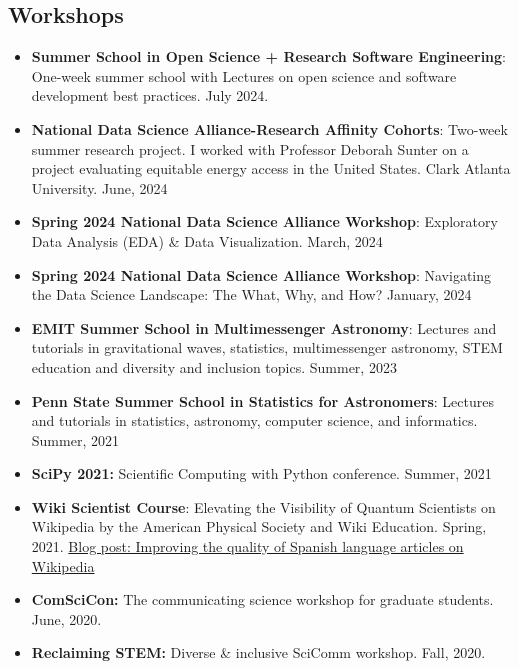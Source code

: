 \documentclass[letterpaper,10pt]{article}
\begin{document}
\subsection*{Workshops}
\begin{itemize}[label=$\blacktriangleright$]


\item \textbf{Summer School in Open Science + Research Software Engineering}: One-week summer school with Lectures on open science and software development best practices. July 2024.




\item \textbf{National Data Science Alliance-Research Affinity Cohorts}: Two-week summer research project. I worked with Professor Deborah Sunter on a project evaluating equitable energy access in the United States. Clark Atlanta University. June, 2024


\item \textbf{Spring 2024 National Data Science Alliance Workshop}: Exploratory Data Analysis (EDA) \& Data Visualization. March, 2024



\item \textbf{Spring 2024 National Data Science Alliance Workshop}: Navigating the Data Science Landscape: The What, Why, and How? January, 2024


\item \textbf{EMIT Summer School in Multimessenger Astronomy}: Lectures and tutorials in gravitational waves, statistics, multimessenger astronomy, STEM education and diversity and inclusion topics. Summer, 2023

\item \textbf{Penn State Summer School in Statistics for Astronomers}: Lectures and tutorials in statistics, astronomy, computer science, and informatics. Summer, 2021

\item \textbf{SciPy 2021:} Scientific Computing with Python conference. Summer, 2021
    \item  \textbf{Wiki Scientist Course}: Elevating the Visibility of Quantum Scientists on Wikipedia by the American Physical Society and Wiki Education. Spring, 2021. \href{https://wikiedu.org/blog/2021/05/24/improving-the-quality-of-spanish-language-articles-on-wikipedia/}{Blog post: Improving the quality of Spanish language articles on Wikipedia}
    \item \textbf{ComSciCon:} The communicating science workshop for graduate students. June, 2020.
    \item \textbf{Reclaiming STEM:} Diverse \& inclusive SciComm workshop. Fall, 2020.
    

\end{itemize}
\end{document}
